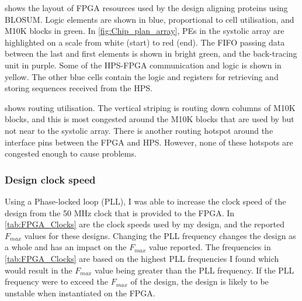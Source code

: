 \pagebreak

 shows the layout of FPGA resources used by the design aligning proteins using BLOSUM.
Logic elements are shown in blue, proportional to cell utilisation, and M10K blocks in green.
In \cref{fig:Chip_plan_array}, PEs in the systolic array are highlighted on a scale from white (start) to red (end).
The FIFO passing data between the last and first elements is shown in bright green, and the back-tracing unit in purple.
Some of the HPS-FPGA communication and logic is shown in yellow.
The other blue cells contain the logic and registers for retrieving and storing sequences received from the HPS.

 shows routing utilisation.
The vertical striping is routing down columns of M10K blocks, and this is most congested around the M10K blocks that are used by but not near to the systolic array.
There is another routing hotspot around the interface pins between the FPGA and HPS.
However, none of these hotspots are congested enough to cause problems.


\subsubsection{Design clock speed}
\label{sec:SV_Fmax}

Using a Phase-locked loop (PLL), I was able to increase the clock speed of the design from the 50 MHz clock that is provided to the FPGA.
In \cref{tab:FPGA_Clocks} are the clock speeds used by my design, and the reported $F_{max}$ values for these designs.
Changing the PLL frequency changes the design as a whole and has an impact on the $F_{max}$ value reported.
The frequencies in \cref{tab:FPGA_Clocks} are based on the highest PLL frequencies I found which would result in the $F_{max}$ value being greater than the PLL frequency.
If the PLL frequency were to exceed the $F_{max}$ of the design, the design is likely to be unstable when instantiated on the FPGA.

